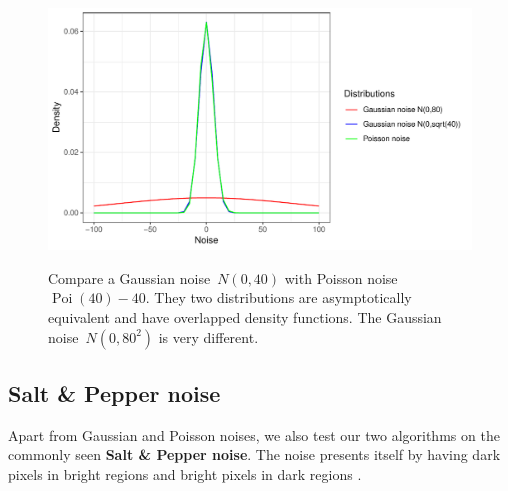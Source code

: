 \begin{figure}
  \centering
  \includegraphics[scale=.8]{noise}\\
  \caption{Compare a Gaussian noise~$N(0,40)$ with Poisson noise $\operatorname{Poi}(40)-40$. They two distributions are asymptotically equivalent and have overlapped density functions. The Gaussian noise~$N(0,80^2)$ is very different.}\label{noise}
\end{figure}

\subsection{Salt \& Pepper noise}
Apart from Gaussian and Poisson noises, we also test our two algorithms on the commonly seen \textbf{Salt \& Pepper noise}. The noise presents itself by having dark pixels in bright regions and bright pixels in dark regions \citep{sampat2005computer}.

